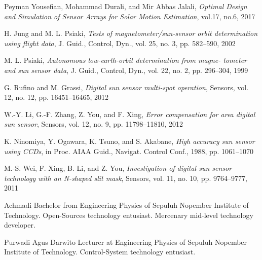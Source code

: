 \documentclass[journal]{IEEEtran}
\begin{document}
\begin{thebibliography}{1}

Peyman Yousefian, Mohammad Durali, and Mir Abbas Jalali, 
\emph{Optimal Design and Simulation of Sensor Arrays for Solar Motion Estimation},
vol.17, no.6, 2017

H. Jung and M. L. Psiaki, 
\emph{Tests of magnetometer/sun-sensor orbit determination using flight data},
J. Guid., Control, Dyn., vol. 25, no. 3, pp. 582–590, 2002

M. L. Psiaki, 
\emph{Autonomous low-earth-orbit determination from magne- tometer and sun sensor data},
J. Guid., Control, Dyn., vol. 22, no. 2, pp. 296–304, 1999

G. Rufino and M. Grassi, 
\emph{Digital sun sensor multi-spot operation},
Sensors, vol. 12, no. 12, pp. 16451–16465, 2012

W.-Y. Li, G.-F. Zhang, Z. You, and F. Xing,
\emph{Error compensation for area digital sun sensor},
Sensors, vol. 12, no. 9, pp. 11798–11810, 2012

K. Ninomiya, Y. Ogawara, K. Tsuno, and S. Akabane,
\emph{High accuracy sun sensor using CCDs},
in Proc. AIAA Guid., Navigat. Control Conf., 1988, pp. 1061–1070

M.-S. Wei, F. Xing, B. Li, and Z. You,
\emph{Investigation of digital sun sensor technology with an N-shaped slit mask},
Sensors, vol. 11, no. 10, pp. 9764–9777, 2011

\end{thebibliography}





\begin{IEEEbiography}{Achmadi}
Bachelor from Engineering Physics of Sepuluh Nopember Institute of Technology.
Open-Sources technology entusiast.
Mercenary mid-level technology developer.
\end{IEEEbiography}

\begin{IEEEbiography}{Purwadi Agus Darwito}
Lecturer at Engineering Physics of Sepuluh Nopember Institute of Technology.
Control-System technology entusiast.
\end{IEEEbiography}
\end{document}

